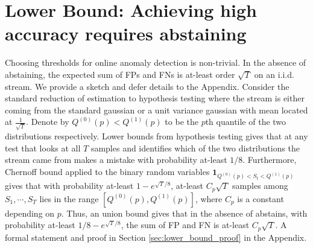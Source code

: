 
\section{Lower Bound: Achieving high accuracy requires abstaining}
%
Choosing thresholds for online anomaly detection is non-trivial.
In the absence of abstaining, the expected sum of FPs and FNs is at-least order $\sqrt{T}$ on an i.i.d. stream. We provide a sketch and defer details to the Appendix. Consider the standard reduction of estimation to hypothesis testing \cite{wainwright2019high} where the stream is either coming from the standard gaussian or a unit variance gaussian with mean located at $\frac{1}{\sqrt{T}}$. Denote by $Q^{(0)}(p) < Q^{(1)}(p)$ to be the $p$th quantile of the two distributions respectively. Lower bounds from hypothesis testing gives that at any test that looks at all $T$ samples and identifies which of the two distributions the stream came from makes a mistake with probability at-least $1/8$. Furthermore, Chernoff bound applied to the binary random variables $\mathbf{1}_{Q^{(0)}(p) < S_t < Q^{(1)}(p)}$ gives that with probability at-least $1-e^{\sqrt{T}/8}$, at-least ${C_p\sqrt{T}}$ samples among $S_1, \cdots, S_T$ lies in the range $[Q^{(0)}(p), Q^{(1)}(p)]$, where $C_p$ is a constant depending on $p$. Thus, an union bound gives that in the absence of abstains, with probability at-least $1/8-e^{\sqrt{T}/8}$, the sum of FP and FN is at-least ${C_p\sqrt{T}}$. A formal statement and proof in Section \ref{sec:lower_bound_proof} in the Appendix.

